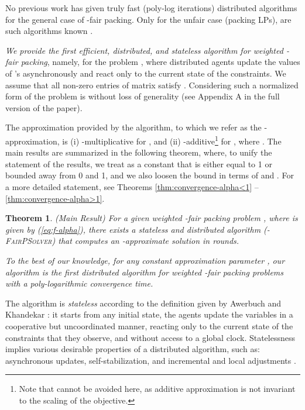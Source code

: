 \documentclass[11pt]{article}
\makeatletter
\newtheorem{theorem}{Theorem}[section]
\renewcommand{\paragraph}{\@startsection{paragraph}{4}{\z@}{1ex \@plus 1ex \@minus .2ex}{-.5em}{\normalfont\normalsize\bfseries}}
\newif\iffullpaper
\makeatother
\begin{document}
No previous work has given truly fast (poly-log iterations) distributed algorithms for the general case of -fair packing.  Only for the unfair  case (packing LPs), are such algorithms  known \cite{AwerbuchKhandekar2009, d-luby1993parallel, d-bartal1997global, dc-young2001sequential, d-kuhn2006price, d-allen2014using}.


\paragraph{Our Results.} 
\emph{We provide the first  efficient, distributed, {and stateless} algorithm for weighted -fair packing}, namely, for the problem ,  {where distributed agents update the values of 's asynchronously and react only to the current state of the constraints}. We assume that all non-zero entries  of matrix  satisfy . Considering such a normalized form of the problem is without loss of generality (see Appendix \iffullpaper \ref{appendix:scaling}\else {A} in the full version of the paper\fi).  

The approximation provided by the algorithm, to which we refer as the  -approximation, is (i) -multiplicative for , and (ii) -additive\footnote{Note that  cannot be avoided here, as additive approximation is not invariant to the scaling of the objective.} for , where . The main results are summarized in the following theorem, where, to unify the statement of the results, we treat  as a constant that is either equal to 1 or bounded away from 0 and 1, and we also loosen the bound in terms of  and . For a more detailed statement, see Theorems \ref{thm:convergence-alpha<1} -- \ref{thm:convergence-alpha>1}. 
\begin{theorem}
(Main Result) For a given weighted -fair packing problem , where  is given by (\ref{eq:f-alpha}), there exists a stateless and distributed algorithm (\textsc{-FairPSolver}) that computes an -approximate solution in  rounds.   
\end{theorem}

\emph{To the best of our knowledge, for any constant approximation parameter , our algorithm is the first distributed algorithm for weighted -fair packing problems with a poly-logarithmic convergence time.} 

The algorithm is \emph{stateless} according to the definition given by  Awerbuch and Khandekar \cite{AwerbuchKhandekar2009, awerbuch2007greedy}: it starts from any initial state, the agents update the variables  in a cooperative but uncoordinated manner, reacting only to the current state of the constraints that they observe, and without access to a global clock. Statelessness implies various desirable properties of a distributed algorithm, such as: asynchronous updates, self-stabilization, and incremental and local adjustments \cite{AwerbuchKhandekar2009, awerbuch2007greedy}.  
\end{document}
